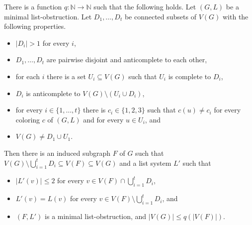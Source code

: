 \documentclass[11pt]{article}
\begin{document}

\begin{claim}
\label{reducecomponents}
There is a function $q: \mathbb{N} \rightarrow \mathbb{N}$ such that the following holds.
Let $(G,L)$ be a minimal list-obstruction. Let $D_1, \ldots, D_t$ be connected subsets of $V(G)$ with the following properties.
\begin{itemize}
\item $|D_i|>1$ for every $i$,
\item $D_1, \ldots, D_t$ are pairwise disjoint and anticomplete to each other,
\item for each $i$ there is a set $U_i \subseteq V(G)$ such  that $U_i$ is complete to $D_i$,
\item $D_i$ is anticomplete to $V(G) \setminus (U_i \cup D_i)$,
\item for every $i \in \{1, \ldots, t\}$ there is $c_i \in \{1,2,3\}$
such that $c(u) \neq c_i$ for every coloring $c$ of $(G,L)$ and for every $u \in U_i$, and
\item $V(G) \neq D_1 \cup U_1$.
\end{itemize}
Then there is an induced subgraph $F$ of $G$  such that  
$V(G) \setminus \bigcup_{i=1}^t D_i \subseteq V(F) \subseteq V(G)$ and a list 
system $L'$ such 
that
\begin{itemize}  
\item $|L'(v)| \leq 2$ for every $v \in V(F) \cap  \bigcup_{i=1}^t D_i $,
\item $L'(v)=L(v)$ for every $v \in V(F) \setminus  \bigcup_{i=1}^t D_i $, and
\item $(F,L')$ is a minimal list-obstruction, and $|V(G)| \leq q(|V(F)|)$. 
\end{itemize}
\end{claim}
\end{document}

